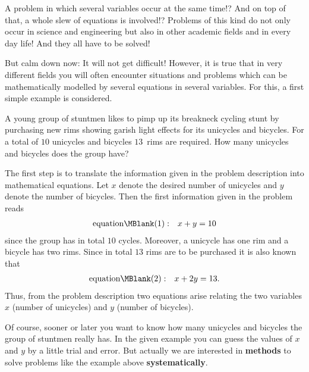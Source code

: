 \begin{MIntro}


A problem in which several variables occur at the same time!? And on top of that, 
a whole slew of equations is involved!? Problems of this kind do not only occur in science and 
engineering but also in other academic fields and in every day life! And they all have to be solved!

But calm down now: It will not get difficult! However, it is true that in very different fields  
you will often encounter situations and problems which can be mathematically modelled by
several equations in several variables. For this, a first simple example is considered.

\begin{MExample}
A young group of stuntmen likes to pimp up its breakneck cycling stunt by purchasing new rims showing 
garish light effects for its unicycles and bicycles. For a total of $10$ unicycles and bicycles
$13$~rims are required. How many unicycles and bicycles does the group have? 

The first step is to translate the information given in the problem description into mathematical equations. Let $x$ denote the desired number of unicycles and $y$ denote the number of 
bicycles. Then the first information given in the problem reads
\begin{eqnarray*}
\mbox{equation}\MBlank (1) & : & x + y = 10
\end{eqnarray*}
since the group has in total $10$ cycles. Moreover, a unicycle has one rim and a bicycle has 
two rims. Since in total $13$ rims are to be purchased it is also known that
\begin{eqnarray*}
\mbox{equation}\MBlank (2) & : & x + 2 y = 13.
\end{eqnarray*}
Thus, from the problem description two equations arise relating the two variables 
$x$ (number of unicycles) and $y$ (number of bicycles).
\end{MExample}

Of course, sooner or later you want to know how many unicycles and bicycles the group 
of stuntmen really has. In the given example you can guess the values of $x$ and $y$ by
a little trial and error. But actually we are interested in \textbf{methods}
to solve problems like the example above \textbf{systematically}.
\end{MIntro}

